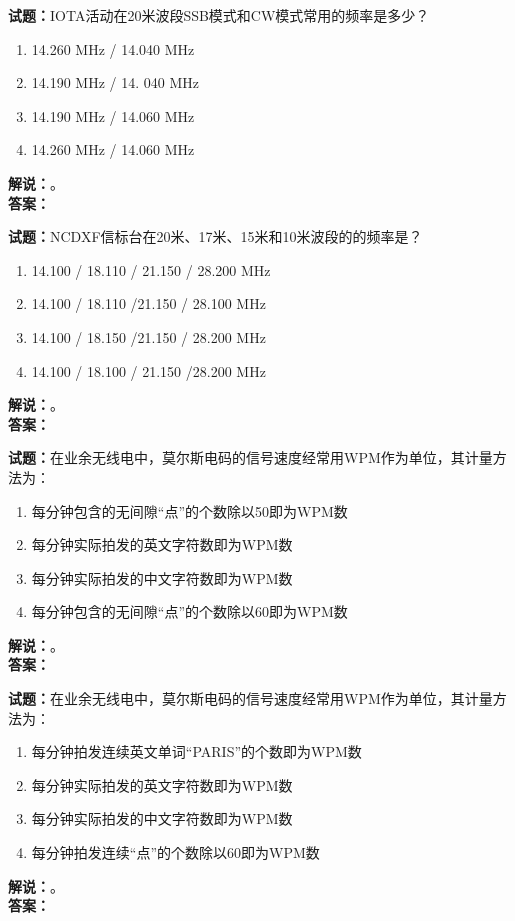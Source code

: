 \documentclass{ctexbook}
\begin{document}
\bigskip

\noindent\textbf{试题：}IOTA活动在20米波段SSB模式和CW模式常用的频率是多少？
\begin{enumerate}[leftmargin=3em]
  \item 14.260 \unit{\MHz} / 14.040 \unit{\MHz}
  \item 14.190 \unit{\MHz} / 14. 040 \unit{\MHz}
  \item 14.190 \unit{\MHz} / 14.060 \unit{\MHz}
  \item 14.260 \unit{\MHz} / 14.060 \unit{\MHz}
\end{enumerate}
\noindent\textbf{解说：}\textbf{}。\\\noindent\textbf{答案：}

\bigskip

\noindent\textbf{试题：}NCDXF信标台在20米、17米、15米和10米波段的的频率是？
\begin{enumerate}[leftmargin=3em]
  \item 14.100 / 18.110 / 21.150 / 28.200 \unit{\MHz}
  \item 14.100 / 18.110 /21.150 / 28.100 \unit{\MHz}
  \item 14.100 / 18.150 /21.150 / 28.200 \unit{\MHz}
  \item 14.100 / 18.100 / 21.150 /28.200 \unit{\MHz}
\end{enumerate}
\noindent\textbf{解说：}\textbf{}。\\\noindent\textbf{答案：}

\bigskip

\noindent\textbf{试题：}在业余无线电中，莫尔斯电码的信号速度经常用WPM作为单位，其计量方法为：
\begin{enumerate}[leftmargin=3em]
  \item 每分钟包含的无间隙“点”的个数除以50即为WPM数
  \item 每分钟实际拍发的英文字符数即为WPM数
  \item 每分钟实际拍发的中文字符数即为WPM数
  \item 每分钟包含的无间隙“点”的个数除以60即为WPM数
\end{enumerate}
\noindent\textbf{解说：}\textbf{}。\\\noindent\textbf{答案：}

\bigskip

\noindent\textbf{试题：}在业余无线电中，莫尔斯电码的信号速度经常用WPM作为单位，其计量方法为：
\begin{enumerate}[leftmargin=3em]
  \item 每分钟拍发连续英文单词“PARIS”的个数即为WPM数
  \item 每分钟实际拍发的英文字符数即为WPM数
  \item 每分钟实际拍发的中文字符数即为WPM数
  \item 每分钟拍发连续“点”的个数除以60即为WPM数
\end{enumerate}
\noindent\textbf{解说：}\textbf{}。\\\noindent\textbf{答案：}
\end{document}
